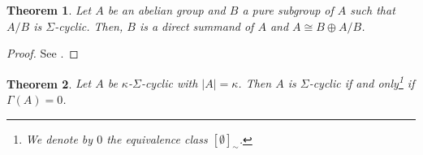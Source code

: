 \documentclass[a4paper]{amsart}
\newtheorem{theorem}{Theorem}[section]
\theoremstyle{definition}
\theoremstyle{remark}
\numberwithin{equation}{section}
\begin{document}
\begin{theorem}
    \label{thm:cyclic-quotient-summand}
    Let $A$ be an abelian group and $B$ a pure subgroup of $A$ such that $A/B$ is $\Sigma$-cyclic. Then, $B$ is a direct summand of $A$ and $A \cong B \oplus A/B$.
\end{theorem}

\begin{proof}
    See \cite[p. 15]{Kap54}.
\end{proof}

    \begin{theorem}
        \label{thm:Gamma invariant groups}
        Let \(A\) be \(\kappa\)-\(\Sigma\)-cyclic with \(|A|=\kappa\). Then \(A\) is \(\Sigma\)-cyclic if and only\footnote{We denote by \(0\) the equivalence class \([\emptyset]_\sim\).} if \(\Gamma(A) = 0\).
    \end{theorem}
\end{document}
